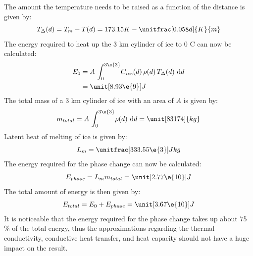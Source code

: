 \begin{table}[htb]
	\centering
	\caption{Specific heat capacity of ice for different temperatures\cite{website:iceDensity}}
	\label{tab:ice_heat_capacity}
\end{table}
The amount the temperature needs to be raised as a function of the distance is given by:
\begin{equation}\label{eq:T_diff}
	T_\Delta(d) = T_m - T(d) = 173.15 K - \unitfrac[0.058 d]{K}{m}
\end{equation}
The energy required to heat up the 3 km cylinder of ice to 0 \textdegree C can now be calculated:
\begin{align}
	E_0 &= A \, \int_0^{3\e{3}} \! C_{ice}(d) \, \rho(d) \, T_\Delta(d) \ \mathrm{d}d \\ \nonumber
	    &= \unit[8.93 \e{9}]{J}
\end{align}
The total mass of a 3 km cylinder of ice with an area of $A$ is given by:
\begin{equation}\label{eq:ice_total_mass}
	m_{total} = A \, \int_0^{3\e{3}} \! \rho(d) \ \mathrm{d}d = \unit[83174]{kg}
\end{equation}
Latent heat of melting of ice is given by\cite{website:waterLatentHeat}:
\begin{equation}
	L_m = \unitfrac[333.55 \e{3}]{J}{kg}
\end{equation}
The energy required for the phase change can now be calculated:
\begin{equation}
	E_{phase} = L_m m_{total} = \unit[2.77 \e{10}]{J}
\end{equation}
The total amount of energy is then given by:
\begin{equation}\label{eq:E_total}
	E_{total} = E_0 + E_{phase} = \unit[3.67 \e{10}]{J}
\end{equation}
It is noticeable that the energy required for the phase change takes up about 75 \% of the total energy, thus the approximations regarding the thermal conductivity, conductive heat transfer, and heat capacity should not have a huge impact on the result.

